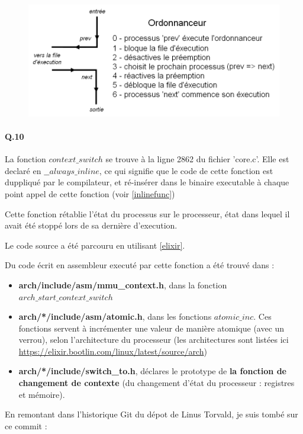 \documentclass[10pt]{article}
\begin{document}
    \begin{figure}[h!]
        \includegraphics[width=12cm]{q9.png}
    \end{figure}

 \paragraph{Q.10}
 La fonction $context\_switch$ se trouve à la ligne 2862 du fichier 'core.c'.
 Elle est declaré en $\_\_always\_inline$, ce qui signifie que le code de cette fonction est duppliqué par le compilateur,
 et ré-insérer dans le binaire executable à chaque point appel de cette fonction (voir \ref{inlinefunc})
 
 Cette fonction rétablie l'état du processus sur le processeur, état dans lequel il avait été stoppé lors de sa dernière d'execution.
 
 Le code source a été parcouru en utilisant \ref{elixir}.
 
 Du code écrit en assembleur executé par cette fonction a été trouvé dans :
 \begin{itemize}
  \item \textbf{arch/include/asm/mmu\_context.h}, dans la fonction $arch\_start\_context\_switch$
  \item \textbf{arch/*/include/asm/atomic.h}, dans les fonctions $atomic\_inc$.
  Ces fonctions servent à incrémenter une valeur de manière atomique (avec un verrou), selon l'architecture du processeur (les architectures sont listées ici \href{https://elixir.bootlin.com/linux/latest/source/arch}{https://elixir.bootlin.com/linux/latest/source/arch})
  \item \textbf{arch/*/include/switch\_to.h}, déclares le prototype de \textbf{la fonction de changement de contexte} (du changement d'état du processeur : registres et mémoire).
\end{itemize}

  En remontant dans l'historique Git du dépot de Linus Torvald, je suis tombé sur ce commit :
  
\end{document}
